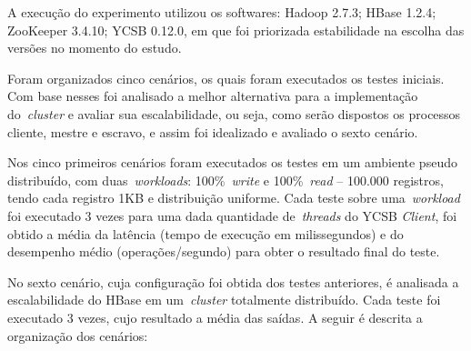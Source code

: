 \documentclass[12pt]{article}
\begin{document}
A execução do experimento utilizou os softwares: Hadoop 2.7.3; HBase 1.2.4; ZooKeeper 3.4.10; YCSB 0.12.0, em que foi priorizada estabilidade na escolha das versões no momento do estudo.

Foram organizados cinco cenários, os quais foram executados os testes iniciais. 
Com base nesses foi analisado a melhor alternativa para a implementação do~\emph{cluster} e avaliar sua escalabilidade, ou seja, como serão dispostos os processos cliente, mestre e escravo, e assim foi idealizado e avaliado o sexto cenário.

Nos cinco primeiros cenários foram executados os testes em um ambiente pseudo distribuído, com duas~\emph{workloads}: 100\%~\emph{write} e 100\%~\emph{read} -- 100.000 registros, tendo cada registro 1KB e distribuição uniforme. Cada teste sobre uma~\emph{workload} foi executado 3 vezes para uma dada quantidade de~\emph{threads} do YCSB \textit{Client}, foi obtido a média da latência (tempo de execução em milissegundos) e do desempenho médio (operações/segundo) para obter o resultado final do teste.

No sexto cenário, cuja configuração foi obtida dos testes anteriores, é analisada a escalabilidade do HBase em um~\emph{cluster} totalmente distribuído.
Cada teste foi executado 3 vezes, cujo resultado a média das saídas. 
A seguir é descrita a organização dos cenários:
\end{document}

